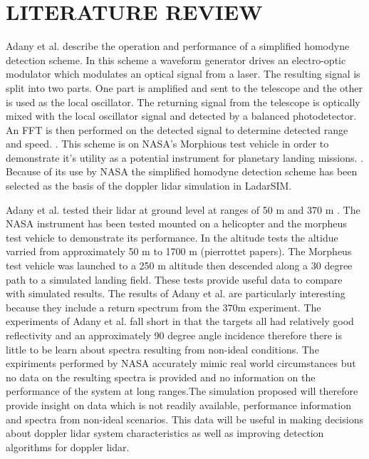 %
%
%
%

\chapter{LITERATURE REVIEW}

Adany et al.
describe the operation and performance of a simplified homodyne detection
scheme.
In this scheme a waveform generator drives an electro-optic modulator which
modulates an optical signal from a laser.
The resulting signal is split into two parts.
One part is amplified and sent to the telescope and the other is used as
the local oscillator.
The returning signal from the telescope is optically mixed with the local
oscillator signal and detected by a balanced photodetector.
An FFT is then performed on the detected signal to determine detected range
and speed.
\cite{adany09}.
This scheme is on NASA's Morphious test vehicle in order to demonstrate
it's utility as a potential instrument for planetary landing missions.
\cite{amz12}.
Because of its use by NASA the simplified homodyne detection scheme has
been selected as the basis of the doppler lidar simulation in LadarSIM.

Adany et al.
tested their lidar at ground level at ranges of 50 m and 370 m \cite{adany09}.
The NASA instrument has been tested mounted on a helicopter and the morpheus
test vehicle to demonstrate its performance.
In the altitude tests the altidue varried from approximately 50 m to 1700
m (pierrottet papers).
The Morpheus test vehicle was launched to a 250 m altitude then descended
along a 30 degree path to a simulated landing field.
These tests provide useful data to compare with simulated results.
The results of Adany et al.
are particularly interesting because they include a return spectrum from
the 370m experiment.
The experiments of Adany et al.
fall short in that the targets all had relatively good reflectivity and
an approximately 90 degree angle incidence therefore there is little to
be learn about spectra resulting from non-ideal conditions.
The expiriments performed by NASA accurately mimic real world circumstances
but no data on the resulting spectra is provided and no information on
the performance of the system at long ranges.The simulation proposed will
therefore provide insight on data which is not readily available, performance
information and spectra from non-ideal scenarios.
This data will be useful in making decisions about doppler lidar system
characteristics as well as improving detection algorithms for doppler lidar.
